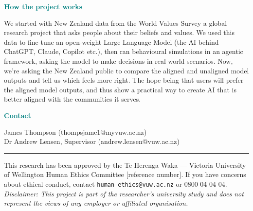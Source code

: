 \documentclass[11pt, a4paper]{article}
\begin{document}
\vspace{0.6em}

\noindent\textcolor{teal}{\textbf{How the project works}}
\small

\noindent We started with New Zealand data from the World Values Survey a global research project that asks people about their beliefs and values. We
used this data to fine-tune an open-weight Large Language Model (the AI behind ChatGPT, Claude, Copilot etc.), then ran behavioural
simulations in an agentic framework, asking the model to make decisions in
real-world scenarios. Now, we're asking the New Zealand public to compare
the aligned and unaligned model outputs and tell us which feels more right. The hope being that users will prefer the aligned model outputs, and thus show a practical way to create AI that is better aligned with the communities it serves.

\vspace{0.6em}

\noindent\textcolor{teal}{\textbf{Contact}}
\small

\noindent
James Thompson (thompsjame1@myvuw.ac.nz) \\
Dr Andrew Lensen, Supervisor (andrew.lensen@vuw.ac.nz)

\vspace{0.3em}
\noindent\textcolor{accent}{\rule{\textwidth}{0.3pt}}

\noindent\scriptsize
This research has been approved by the Te Herenga Waka --- Victoria University
of Wellington Human Ethics Committee [reference number]. If you have concerns
about ethical conduct, contact \texttt{human-ethics@vuw.ac.nz} or 0800 04 04 04. \\[4pt]
\noindent\scriptsize
\textit{Disclaimer: This project is part of the researcher's university study
and does not represent the views of any employer or affiliated organisation.}
\end{document}

